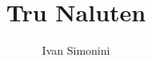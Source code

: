 \documentclass[a4paper,10pt,twoside,cleardoubleempty]{scrbook}
\title{Tru Naluten}
\author{Ivan Simonini}
\begin{document}
\maketitle
\tableofcontents

\cleardoublepage\part{}

%
%
%
%
%
%
%
%
\end{document}
